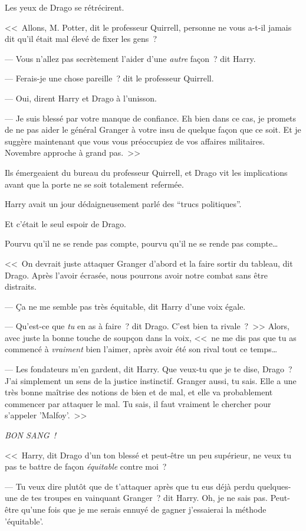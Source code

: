 Les yeux de Drago se rétrécirent.

<<~Allons, M. Potter, dit le professeur Quirrell, personne ne vous a-t-il jamais dit qu'il était mal élevé de fixer les gens~?

--- Vous n'allez pas secrètement l'aider d'une \emph{autre} façon~? dit Harry.

--- Ferais-je une chose pareille~? dit le professeur Quirrell.

--- Oui, dirent Harry et Drago à l'unisson.

--- Je suis blessé par votre manque de confiance. Eh bien dans ce cas, je promets de ne pas aider le général Granger à votre insu de quelque façon que ce soit. Et je suggère maintenant que vous vous préoccupiez de vos affaires militaires. Novembre approche à grand pas.~>>

\later

Ils émergeaient du bureau du professeur Quirrell, et Drago vit les implications avant que la porte ne se soit totalement refermée.

Harry avait un jour dédaigneusement parlé des “trucs politiques”.

Et c'était le seul espoir de Drago.

Pourvu qu'il ne se rende pas compte, pourvu qu'il ne se rende pas compte…

<<~On devrait juste attaquer Granger d'abord et la faire sortir du tableau, dit Drago. Après l'avoir écrasée, nous pourrons avoir notre combat sans être distraits.

--- Ça ne me semble pas très équitable, dit Harry d'une voix égale.

--- Qu'est-ce que \emph{tu} en as à faire~? dit Drago. C'est bien ta rivale~?~>> Alors, avec juste la bonne touche de soupçon dans la voix, <<~ne me dis pas que tu as commencé à \emph{vraiment} bien l'aimer, après avoir été son rival tout ce temps…

--- Les fondateurs m'en gardent, dit Harry. Que veux-tu que je te dise, Drago~? J'ai simplement un sens de la justice instinctif. Granger aussi, tu sais. Elle a une très bonne maîtrise des notions de bien et de mal, et elle va probablement commencer par attaquer le mal. Tu sais, il faut vraiment le chercher pour s'appeler 'Malfoy'.~>>

\emph{BON SANG~!}

<<~Harry, dit Drago d'un ton blessé et peut-être un peu supérieur, ne veux tu pas te battre de façon \emph{équitable} contre moi~?

--- Tu veux dire plutôt que de t'attaquer après que tu eus déjà perdu quelques-une de tes troupes en vainquant Granger~? dit Harry. Oh, je ne sais pas. Peut-être qu'une fois que je me serais ennuyé de gagner j'essaierai la méthode 'équitable'.

